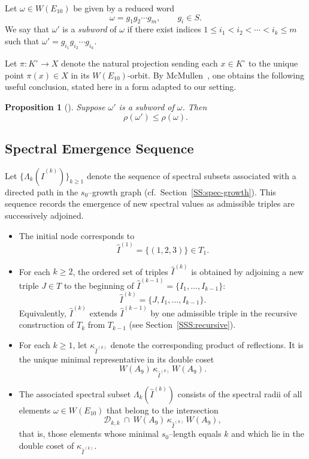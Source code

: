 \documentclass[11pt]{amsart}
\numberwithin{equation}{section}
\newtheorem{prop}[thm]{Proposition}
\begin{document}
Let $\omega \in W(E_{10})$ be given by a reduced word
\[
\omega = g_1 g_2 \cdots g_m, \qquad g_i \in S.
\]
We say that $\omega'$ is a \emph{subword} of $\omega$ if there exist 
indices $1 \le i_1 < i_2 < \cdots < i_k \le m$ such that
$\omega' = g_{i_1} g_{i_2} \cdots g_{i_k}$.

\medskip
Let $\pi: K^\circ \to X$ denote the natural projection sending each 
$x\in K^\circ$ to the unique point $\pi(x)\in X$ in its 
$W(E_{10})$-orbit. 
By McMullen~\cite[Section~4]{McMullen:2002}, one obtains the following 
useful conclusion, stated here in a form adapted to our setting.

\begin{prop}[{\cite[Section~4]{McMullen:2002}}]\label{P:mcmullen}
Suppose $\omega'$ is a subword of $\omega$. Then 
\[
\rho(\omega') \le \rho(\omega).
\]
\end{prop}

\subsection{Spectral Emergence Sequence}\label{SS:spectralG}

Let $\{\Lambda_k(\widehat I^{(k)})\}_{k\ge1}$ denote the sequence of
spectral subsets associated with a directed path in the
$s_0$--growth graph (cf.~Section~\ref{SS:spec-growth}).
This sequence records the emergence of new spectral values
as admissible triples are successively adjoined.

\begin{itemize}
\item[(1)] The initial node corresponds to
\[
\widehat I^{(1)} = \{(1,2,3)\} \in T_1.
\]

\item[(2)] For each $k\ge2$, the ordered set of triples
$\widehat I^{(k)}$ is obtained by adjoining a new triple
$J\in T$ to the beginning of $\widehat I^{(k-1)}=\{I_1,\dots,I_{k-1}\}$:
\[
\widehat I^{(k)} = \{J, I_1, \dots, I_{k-1}\}.
\]
Equivalently, $\widehat I^{(k)}$ extends $\widehat I^{(k-1)}$
by one admissible triple in the recursive construction
of $T_k$ from $T_{k-1}$ (see Section~\ref{SSS:recursive}).

\item[(3)] For each $k\ge1$, let
$\kappa_{\widehat I^{(k)}}$ denote the corresponding product of
reflections.  It is the unique minimal representative in its
double coset
\[
W(A_9)\,\kappa_{\widehat I^{(k)}}\,W(A_9).
\]

\item[(4)] The associated spectral subset
$\Lambda_k(\widehat I^{(k)})$ consists of the spectral radii
of all elements $\omega\in W(E_{10})$
that belong to the intersection
\[
\mathcal{D}_{k,k}\ \cap\
W(A_9)\,\kappa_{\widehat I^{(k)}}\,W(A_9),
\]
that is, those elements whose minimal $s_0$--length equals $k$
and which lie in the double coset of $\kappa_{\widehat I^{(k)}}$.
\end{itemize}
\end{document}
